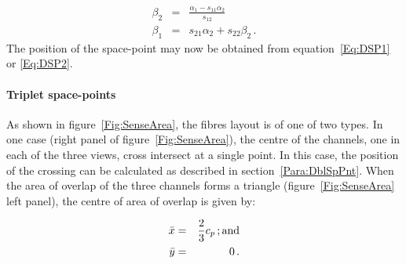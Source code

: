 \begin{eqnarray}
  \beta_2 & = & \frac{\alpha_1 - s_{11} \alpha_2}{s_{12}}     \\
  \beta_1 & = & s_{21} \alpha_2 + s_{22} \beta_2 \, .
\end{eqnarray}
The position of the space-point may now be obtained from equation~\ref{Eq:DSP1} or \ref{Eq:DSP2}.

\paragraph{Triplet space-points}

As shown in figure~\ref{Fig:SenseArea}, the fibres layout is of one of two types. In one case (right panel of figure~\ref{Fig:SenseArea}), the centre of the channels, one in each of the three views, cross intersect at a single point. In this case, the position of the crossing can be calculated as described in section~\ref{Para:DblSpPnt}. When the area of overlap of the three channels forms a triangle (figure~\ref{Fig:SenseArea} left panel), the centre of area of overlap is given by:

\begin{eqnarray}
  \bar{x} & = & \frac{2}{3}c_p \, {\rm ; and}       \\
  \bar{y} & = & 0 \, .
\end{eqnarray}
